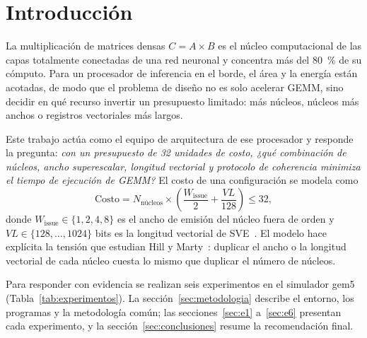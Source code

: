 \documentclass[journal]{IEEEtran}
\begin{document}
\section{Introducción}

La multiplicación de matrices densas $C = A \times B$ es el núcleo
computacional de las capas totalmente conectadas de una red neuronal y
concentra más del \SI{80}{\percent} de su cómputo. Para un procesador de
inferencia en el borde, el área y la energía están acotadas, de modo que
el problema de diseño no es solo acelerar GEMM, sino decidir en qué
recurso invertir un presupuesto limitado: más núcleos, núcleos más
anchos o registros vectoriales más largos.

Este trabajo actúa como el equipo de arquitectura de ese procesador y
responde la pregunta: \emph{con un presupuesto de 32 unidades de costo,
¿qué combinación de núcleos, ancho superescalar, longitud vectorial y
protocolo de coherencia minimiza el tiempo de ejecución de GEMM?} El
costo de una configuración se modela como
\begin{equation}
  \mathrm{Costo} = N_{\text{núcleos}} \times
  \left( \frac{W_{\text{issue}}}{2} + \frac{VL}{128} \right) \le 32,
  \label{eq:costo}
\end{equation}
donde $W_{\text{issue}} \in \{1{,}2,4{,}8\}$ es el ancho de emisión del
núcleo fuera de orden y $VL \in \{128, \dots, 1024\}$ bits es la
longitud vectorial de SVE~\cite{stephens2017sve}. El modelo hace
explícita la tensión que estudian Hill y Marty~\cite{hill2008amdahl}:
duplicar el ancho o la longitud vectorial de cada núcleo cuesta lo mismo
que duplicar el número de núcleos.

Para responder con evidencia se realizan seis experimentos en el
simulador gem5~\cite{binkert2011gem5,lowepower2020gem5}
(Tabla~\ref{tab:experimentos}). La sección~\ref{sec:metodologia}
describe el entorno, los programas y la metodología común; las
secciones~\ref{sec:e1} a~\ref{sec:e6} presentan cada experimento, y la
sección~\ref{sec:conclusiones} resume la recomendación final.
\end{document}
